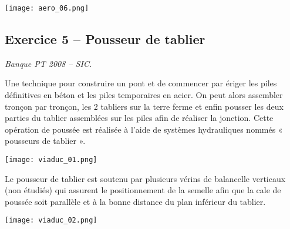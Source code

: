 \begin{multicols}{2}

\begin{center}
\texttt{[image: aero\_06.png]}
\end{center}

%
%
%
%


\subsection*{Exercice 5 -- Pousseur de tablier}
\setcounter{exo}{0}
\begin{flushright}
\textit{Banque PT 2008 -- SIC.}
\end{flushright}

Une technique pour construire un pont et de commencer par ériger les piles définitives en béton et les piles
temporaires en acier. On peut alors assembler tronçon par tronçon, les 2 tabliers sur la terre ferme et enfin
pousser les deux parties du tablier assemblées sur les piles afin de réaliser la jonction.
Cette opération de poussée est réalisée à l’aide de systèmes hydrauliques nommés « pousseurs
de tablier ». 

\begin{center}
\texttt{[image: viaduc\_01.png]}
\end{center}

Le pousseur de tablier est soutenu par plusieurs vérins de balancelle verticaux (non étudiés) qui assurent le positionnement de la semelle afin que la cale de poussée soit parallèle et à la bonne distance du plan inférieur du tablier. 
\begin{center}
\texttt{[image: viaduc\_02.png]}
\end{center}


\end{multicols}
